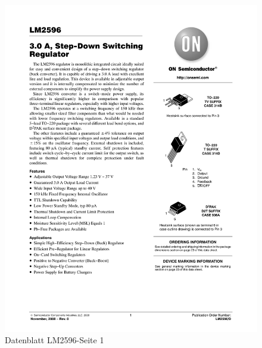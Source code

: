 \documentclass[12pt,a4paper]{article}
\begin{document}
\begin{figure}[H]
  \centering
		\includegraphics[scale=0.75, angle=0,page=1]{graphics/LM2596.PDF}
		\caption{Datenblatt LM2596-Seite 1}
		\label{datasheet:LM2596-1}
\end{figure}
\end{document}
